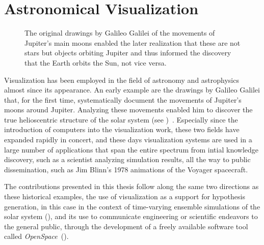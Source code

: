 \section{Astronomical Visualization} \label{contributions:astro}
\begin{figure}
\centering
{}
\caption{The original drawings by Galileo Galilei of the movements of Jupiter's main moons enabled the later realization that these are not stars but objects orbiting Jupiter and thus informed the discovery that the Earth orbits the Sun, not vice versa.}
\label{contributions:astro:galileo}
\end{figure}

Visualization has been employed in the field of astronomy and astrophysics almost since its appearance.  An early example are the drawings by Galileo Galilei that, for the first time, systematically document the movements of Jupiter's moons around Jupiter.  Analyzing these movements enabled him to discover the true helioscentric structure of the solar system (see )~\cite{galilei1610sidereus}.  Especially since the introduction of computers into the visualization work, these two fields have expanded rapidly in concert, and these days visualization systems are used in a large number of applications that span the entire spectrum from intial knowledge discovery, such as a scientist analyzing simulation results, all the way to public dissemination, such as Jim Blinn's 1978 animations of the Voyager spacecraft.

The contributions presented in this thesis follow along the same two directions as these historical examples, the use of visualization as a support for hypothesis generation, in this case in the context of time-varying ensemble simulations of the solar system (), and its use to communicate engineering or scientific endeavors to the general public, through the development of a freely available software tool called \emph{OpenSpace}~().


